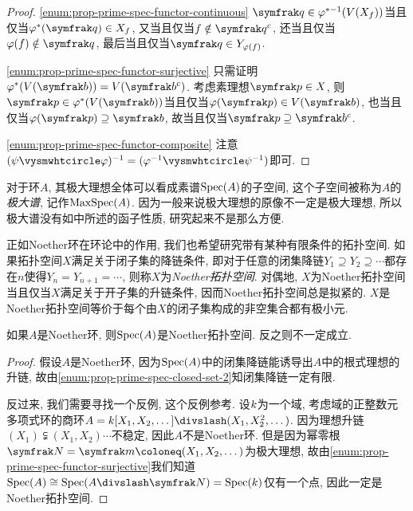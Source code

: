 \begin{proof}
  \ref{enum:prop-prime-spec-functor-continuous} $\ideal{q}\in\varphi^{*-1}(V(X_f))$当且仅当$\varphi^*(\ideal{q})\in X_f$, 又当且仅当$f\notin \ideal{q}^c$, 还当且仅当$\varphi (f)\notin \ideal{q}$, 最后当且仅当$\ideal{q}\in Y_{\varphi (f)}$.

  \ref{enum:prop-prime-spec-functor-surjective} 只需证明$\varphi^*(V(\ideal{b}))=V(\ideal{b}^c)$. 考虑素理想$\ideal{p}\in X$, 则$\ideal{p}\in\varphi^*(V(\ideal{b}))$当且仅当$\varphi(\ideal{p})\in V(\ideal{b})$, 也当且仅当$\varphi(\ideal{p})\supseteq\ideal{b}$, 故当且仅当$\ideal{p}\supseteq\ideal{b}^c$.

  \ref{enum:prop-prime-spec-functor-composite} 注意$(\psi\composite\varphi)^{-1}=(\varphi^{-1}\composite\psi^{-1})$即可.
\end{proof}

对于环$A$, 其极大理想全体可以看成素谱$\operatorname{Spec} (A)$的子空间, 这个子空间被称为$A$的\emph{极大谱}, 记作$\operatorname{MaxSpec} (A)$. 因为一般来说极大理想的原像不一定是极大理想, 所以极大谱没有如中所述的函子性质, 研究起来不是那么方便.

正如Noether环在环论中的作用, 我们也希望研究带有某种有限条件的拓扑空间. 如果拓扑空间$X$满足关于闭子集的降链条件, 即对于任意的闭集降链$Y_1\supseteq Y_2\supseteq\dotsb$都存在$n$使得$Y_n=Y_{n+1}=\dotsb$, 则称$X$为\emph{Noether拓扑空间}. 对偶地, $X$为Noether拓扑空间当且仅当$X$满足关于开子集的升链条件, 因而Noether拓扑空间总是拟紧的\parencite[79, Exercise 5]{atiyah_introduction_1969}. $X$是Noether拓扑空间等价于每个由$X$的闭子集构成的非空集合都有极小元.

\begin{proposition}
  如果$A$是Noether环, 则$\operatorname{Spec} (A)$是Noether拓扑空间. 反之则不一定成立.
\end{proposition}

\begin{proof}
  假设$A$是Noether环, 因为$\operatorname{Spec} (A)$中的闭集降链能诱导出$A$中的根式理想的升链, 故由\ref{enum:prop-prime-spec-closed-set-2}知闭集降链一定有限.

  反过来, 我们需要寻找一个反例, 这个反例参考. 设$k$为一个域, 考虑域的正整数元多项式环的商环$A=\kk [X_1, X_2, \dotsc]{\divslash}(X_1, X_2^2, \dotsc)$. 因为理想升链$(X_1)\subsetneqq (X_1, X_2)\dotsb$不稳定, 因此$A$不是Noether环. 但是因为幂零根$\nil=\ideal{m}\coloneq (X_1, X_2, \dotsc)$为极大理想, 故由\ref{enum:prop-prime-spec-functor-surjective}我们知道$\Spec (A)\cong\Spec (A{\divslash}\nil)=\Spec (\kk)$仅有一个点, 因此一定是Noether拓扑空间.
\end{proof}

